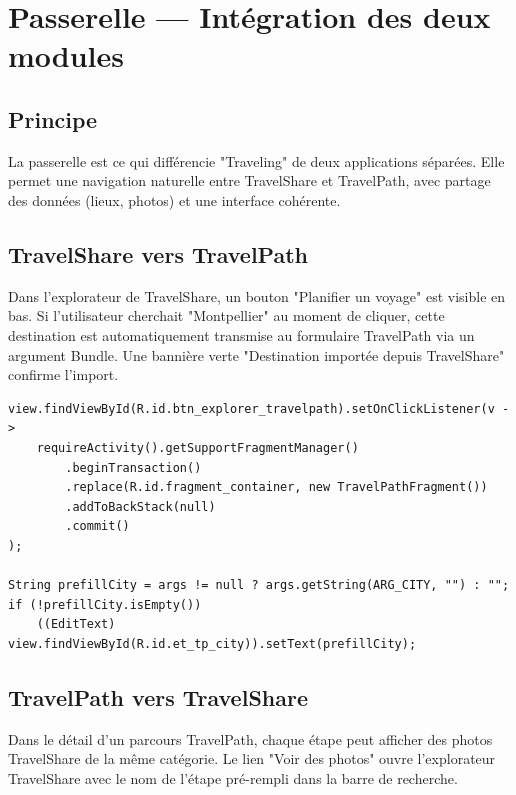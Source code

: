 \documentclass[a4paper,12pt,openany]{report}
\begin{document}
\chapter{Passerelle — Intégration des deux modules}

\section{Principe}

La passerelle est ce qui différencie "Traveling" de deux applications séparées.
Elle permet une navigation naturelle entre TravelShare et TravelPath, avec partage
des données (lieux, photos) et une interface cohérente.

\section{TravelShare vers TravelPath}

Dans l'explorateur de TravelShare, un bouton "Planifier un voyage" est visible
en bas. Si l'utilisateur cherchait "Montpellier" au moment de cliquer, cette
destination est automatiquement transmise au formulaire TravelPath via un argument
Bundle. Une bannière verte "Destination importée depuis TravelShare" confirme l'import.

\begin{lstlisting}
view.findViewById(R.id.btn_explorer_travelpath).setOnClickListener(v ->
    requireActivity().getSupportFragmentManager()
        .beginTransaction()
        .replace(R.id.fragment_container, new TravelPathFragment())
        .addToBackStack(null)
        .commit()
);

String prefillCity = args != null ? args.getString(ARG_CITY, "") : "";
if (!prefillCity.isEmpty())
    ((EditText) view.findViewById(R.id.et_tp_city)).setText(prefillCity);
\end{lstlisting}

\section{TravelPath vers TravelShare}

Dans le détail d'un parcours TravelPath, chaque étape peut afficher des photos
TravelShare de la même catégorie. Le lien "Voir des photos" ouvre l'explorateur
TravelShare avec le nom de l'étape pré-rempli dans la barre de recherche.
\end{document}
